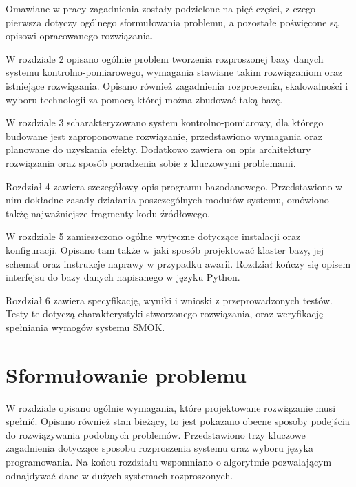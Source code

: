 \documentclass[a4paper,polish,12pt,twoside]{article}
\def \docsection#1{\clearpage\section{#1}}
\begin{document}
Omawiane w pracy zagadnienia zostały podzielone na pięć części, z czego pierwsza dotyczy ogólnego sformułowania problemu, a pozostałe poświęcone są opisowi opracowanego rozwiązania.

W rozdziale 2 opisano ogólnie problem tworzenia rozproszonej bazy danych systemu kontrolno-pomiarowego, wymagania stawiane takim rozwiązaniom oraz istniejące rozwiązania. Opisano również zagadnienia rozproszenia, skalowalności i wyboru technologii za pomocą której można zbudować taką bazę.

W rozdziale 3 scharakteryzowano system kontrolno-pomiarowy, dla którego budowane jest zaproponowane rozwiązanie, przedstawiono wymagania oraz planowane do uzyskania efekty. Dodatkowo zawiera on opis architektury rozwiązania oraz sposób poradzenia sobie z kluczowymi problemami.

Rozdział 4 zawiera szczegółowy opis programu bazodanowego. Przedstawiono w nim dokładne zasady działania poszczególnych modułów systemu, omówiono takżę najważniejsze fragmenty kodu źródłowego.

W rozdziale 5 zamieszczono ogólne wytyczne dotyczące instalacji oraz konfiguracji. Opisano tam także w jaki sposób projektować klaster bazy, jej schemat oraz instrukcje naprawy w przypadku awarii. Rozdział kończy się opisem interfejsu do bazy danych napisanego w języku Python.

Rozdział 6 zawiera specyfikację, wyniki i wnioski z przeprowadzonych testów. Testy te dotyczą charakterystyki stworzonego rozwiązania, oraz weryfikację spełniania wymogów systemu SMOK.

\docsection{Sformułowanie problemu}
		\label{sec:theory}
W rozdziale opisano ogólnie wymagania, które projektowane rozwiązanie musi spełnić. Opisano również stan bieżący, to jest pokazano obecne sposoby podejścia do rozwiązywania podobnych problemów. Przedstawiono trzy kluczowe zagadnienia dotyczące sposobu rozproszenia systemu oraz wyboru języka programowania. Na końcu rozdziału wspomniano o algorytmie pozwalającym odnajdywać dane w dużych systemach rozproszonych.
\end{document}
